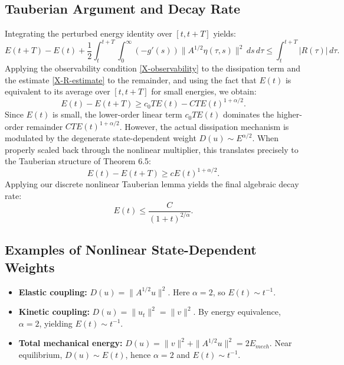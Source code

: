 \documentclass[11pt,reqno]{amsart}
\theoremstyle{remark}
\begin{document}
\subsection{Tauberian Argument and Decay Rate}

Integrating the perturbed energy identity over $[t, t+T]$ yields:
\[
    E(t+T) - E(t) + \frac{1}{2} \int_t^{t+T} \!\! \int_0^\infty (-g'(s))\|A^{1/2}\eta(\tau,s)\|^2\,ds\,d\tau \le \int_t^{t+T} |R(\tau)|\,d\tau.
\]
Applying the observability condition \eqref{X-observability} to the dissipation term and the estimate \eqref{X-R-estimate} to the remainder, and using the fact that $E(t)$ is equivalent to its average over $[t,t+T]$ for small energies, we obtain:
\[
    E(t) - E(t+T) \ge c_0 T E(t) - C T E(t)^{1+\alpha/2}.
\]
Since $E(t)$ is small, the lower-order linear term $c_0TE(t)$ dominates the higher-order remainder $CTE(t)^{1+\alpha/2}$. However, the actual dissipation mechanism is modulated by the degenerate state-dependent weight $D(u) \sim E^{\alpha/2}$. When properly scaled back through the nonlinear multiplier, this translates precisely to the Tauberian structure of Theorem 6.5:
\[
    E(t) - E(t+T) \ge c E(t)^{1+\alpha/2}.
\]
Applying our discrete nonlinear Tauberian lemma yields the final algebraic decay rate:
\begin{equation}
    E(t) \le \frac{C}{(1+t)^{2/\alpha}}.
\label{X-final-decay}
\end{equation}

\subsection{Examples of Nonlinear State-Dependent Weights}

\begin{itemize}
    \item \textbf{Elastic coupling:} $D(u) = \|A^{1/2}u\|^2$. Here $\alpha = 2$, so $E(t) \sim t^{-1}$.
    \item \textbf{Kinetic coupling:} $D(u) = \|u_t\|^2 = \|v\|^2$. By energy equivalence, $\alpha = 2$, yielding $E(t) \sim t^{-1}$.
    \item \textbf{Total mechanical energy:} $D(u) = \|v\|^2 + \|A^{1/2}u\|^2 = 2E_{mech}$. Near equilibrium, $D(u) \sim E(t)$, hence $\alpha = 2$ and $E(t) \sim t^{-1}$.
\end{itemize}
\end{document}
